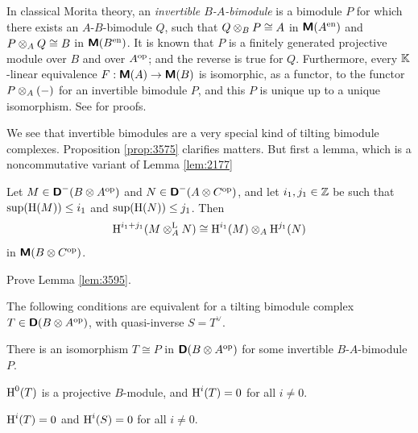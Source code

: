In classical Morita theory, an 
{\em invertible  $B$-$A$-bimodule}%
is a bimodule $P$ for which there exists an $A$-$B$-bimodule $Q$, such that  
$Q \otimes_B P \cong A$ in $\boldsymbol{\mathsf{M}}(A^{\mathrm{en}})$ 
and
$P \otimes_A Q \cong B$ in $\boldsymbol{\mathsf{M}}(B^{\mathrm{en}})$.
It is known that $P$ is a finitely generated projective module over $B$ and 
over $A^{\mathrm{op}}$; and the reverse is true for $Q$. Furthermore, every 
$\mathbb{K}$-linear equivalence 
$F : \boldsymbol{\mathsf{M}}(A) \to \boldsymbol{\mathsf{M}}(B)$
is isomorphic, as a functor, to the functor $P \otimes_A (-)$ for an invertible 
bimodule $P$, and this $P$ is unique up to a unique isomorphism. See 
\cite[Section 4.1]{Row} for proofs. 

We see that invertible bimodules are a very special kind of tilting bimodule 
complexes. Proposition \ref{prop:3575} clarifies matters. 
But first a lemma, which is a noncommutative variant of Lemma \ref{lem:2177}

\begin{lem} \label{lem:3595} 
Let $M \in \boldsymbol{\mathsf{D}}^-(B \otimes A^{\mathrm{op}})$ and 
$N \in \boldsymbol{\mathsf{D}}^-(A \otimes C^{\mathrm{op}})$,  
and let $i_1, j_1 \in \mathbb{Z}$ be such that 
$\operatorname{sup}(\operatorname{H}(M)) \leq i_1$ and $\operatorname{sup}(\operatorname{H}(N)) \leq j_1$. 
Then 
\[ \operatorname{H}^{i_1 + j_1}(M \otimes^{\mathrm{L}}_A N) \cong 
\operatorname{H}^{i_1}(M) \otimes_A \operatorname{H}^{j_1}(N)  \]
in $\boldsymbol{\mathsf{M}}(B \otimes C^{\mathrm{op}})$. 
\end{lem}

\begin{exer} \label{exer:3595}
Prove Lemma \ref{lem:3595}.
\end{exer}

\begin{prop} \label{prop:3575}
The following conditions are equivalent for a tilting bimodule complex 
$T \in \boldsymbol{\mathsf{D}}(B \otimes A^{\mathrm{op}})$, with quasi-inverse $S = T^{\vee}$. 
\begin{enumerate}
 There is an isomorphism $T \cong P$ in 
$\boldsymbol{\mathsf{D}}(B \otimes A^{\mathrm{op}})$
for some invertible $B$-$A$-bimodule $P$. 

 $\operatorname{H}^0(T)$ is a projective $B$-module, and 
$\operatorname{H}^i(T) = 0$ for all $i \neq 0$. 

 $\operatorname{H}^i(T) = 0$ and $\operatorname{H}^i(S) = 0$ for all $i \neq 0$.  
\end{enumerate} 
\end{prop}

